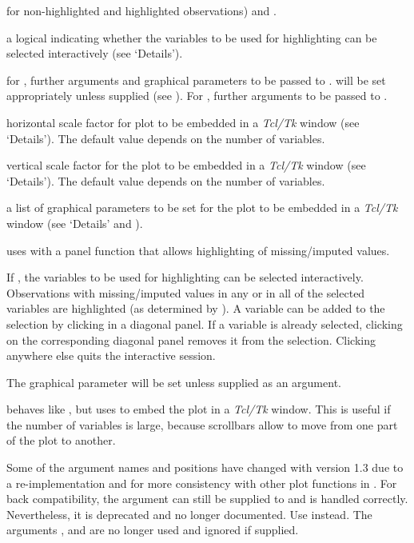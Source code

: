 \begin{Arguments}
\begin{ldescription}
for non-highlighted and highlighted observations) and .
\item[\code{interactive}] a logical indicating whether the variables to be used 
for highlighting can be selected interactively (see `Details').
\item[\code{...}] for , further arguments and 
graphical parameters to be passed to .  
 will be set appropriately unless supplied (see 
).  For , further 
arguments to be passed to .
\item[\code{hscale}] horizontal scale factor for plot to be embedded in a 
\emph{Tcl/Tk} window (see `Details').  The default value 
depends on the number of variables.
\item[\code{vscale}] vertical scale factor for the plot to be embedded in a 
\emph{Tcl/Tk} window (see `Details').  The default value 
depends on the number of variables.
\item[\code{TKRpar}] a list of graphical parameters to be set for the plot 
to be embedded in a \emph{Tcl/Tk} window (see `Details' and 
).
\end{ldescription}
\end{Arguments}
%
\begin{Details}\relax
{} uses  with a panel function 
that allows highlighting of missing/imputed values.

If , the variables to be used for highlighting 
can be selected interactively.  Observations with missing/imputed values in any 
or in all of the selected variables are highlighted (as determined by 
).  A variable can be added to the selection by clicking 
in a diagonal panel.  If a variable is already selected, clicking on the 
corresponding diagonal panel removes it from the selection.  Clicking 
anywhere else quits the interactive session.

The graphical parameter  will be set unless supplied as an 
argument.

 behaves like , but uses 
 to embed the plot in a \emph{Tcl/Tk} 
window.  This is useful if the number of variables is large, because 
scrollbars allow to move from one part of the plot to another.
\end{Details}
%
\begin{Note}\relax
Some of the argument names and positions have changed with version 1.3 
due to a re-implementation and for more consistency with other plot 
functions in .  For back compatibility, the argument 
 can still be supplied to  and is handled 
correctly.  Nevertheless, it is deprecated and no longer documented.  
Use  instead.  The arguments , 
 and  are no longer used and 
ignored if supplied.
\end{Note}
